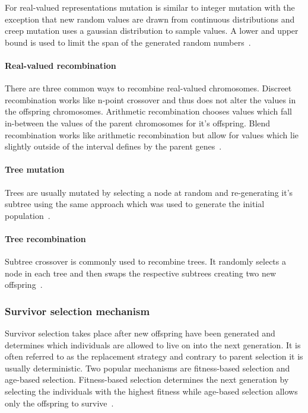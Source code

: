 For real-valued representations mutation is similar to integer mutation with the exception that new random values are drawn from continuous distributions and creep mutation uses a gaussian distribution to sample values. A lower and upper bound is used to limit the span of the generated random numbers~\cite{Eiben201511}.

\paragraph{Real-valued recombination}

There are three common ways to recombine real-valued chromosomes. Discreet recombination works like n-point crossover and thus does not alter the values in the offspring chromosomes. Arithmetic recombination chooses values which fall in-between the values of the parent chromosomes for it's offspring. Blend recombination works like arithmetic recombination but allow for values which lie slightly outside of the interval defines by the parent genes~\cite{Eiben201511}.


\paragraph{Tree mutation}

Trees are usually mutated by selecting a node at random and re-generating it's subtree using the same approach which was used to generate the initial population~\cite{Eiben201511}.

\paragraph{Tree recombination}

Subtree crossover is commonly used to recombine trees. It randomly selects a node in each tree and then swaps the respective subtrees creating two new offspring~\cite{Eiben201511}.


\subsubsection{Survivor selection mechanism}

Survivor selection takes place after new offspring have been generated and determines which individuals are allowed to live on into the next generation. It is often referred to as the replacement strategy and contrary to parent selection it is usually deterministic. Two popular mechanisms are fitness-based selection and age-based selection. Fitness-based selection determines the next generation by selecting the individuals with the highest fitness while age-based selection allows only the offspring to survive~\cite{Eiben2015_whatevolutionary}.


